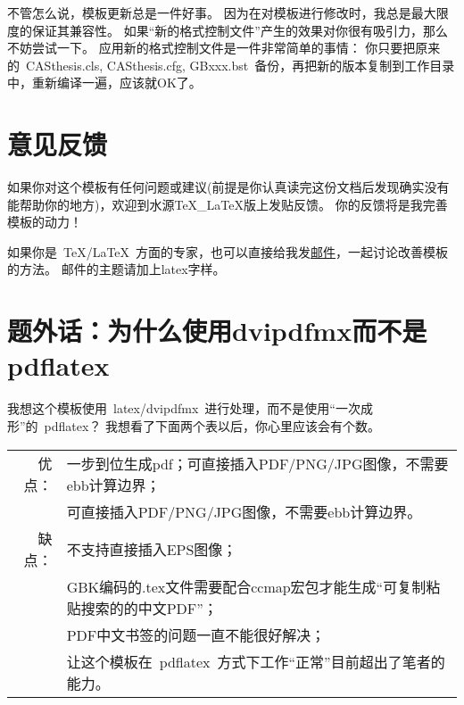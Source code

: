 不管怎么说，模板更新总是一件好事。
因为在对模板进行修改时，我总是最大限度的保证其兼容性。
如果``新的格式控制文件''产生的效果对你很有吸引力，那么不妨尝试一下。
应用新的格式控制文件是一件非常简单的事情：
你只要把原来的~CASthesis.cls, CASthesis.cfg, GBxxx.bst~备份，再把新的版本复制到工作目录中，重新编译一遍，应该就OK了。

\section{意见反馈}
\label{sec:replay}

如果你对这个模板有任何问题或建议(前提是你认真读完这份文档后发现确实没有能帮助你的地方)，欢迎到水源TeX\_LaTeX版上发贴反馈。
你的反馈将是我完善模板的动力！

如果你是~\TeX/\LaTeX~方面的专家，也可以直接给我发\href{mailto:wei.jianwen@gmail.com}{邮件}，一起讨论改善模板的方法。
邮件的主题请加上latex字样。

\section{题外话：为什么使用dvipdfmx而不是pdflatex}
\label{sec:whydvipdfm}

我想这个模板使用~latex/dvipdfmx~进行处理，而不是使用“一次成形”的~pdflatex？
我想看了下面两个表以后，你心里应该会有个数。

\begin{table}[!hbp]
  \centering
  \begin{tabular}{r|l}
    \toprule
    优点： & 一步到位生成pdf；可直接插入PDF/PNG/JPG图像，不需要ebb计算边界； \\
    &  可直接插入PDF/PNG/JPG图像，不需要ebb计算边界。\\
    \midrule
    缺点： & 不支持直接插入EPS图像；\\
    & GBK编码的.tex文件需要配合ccmap宏包才能生成“可复制粘贴搜索的的中文PDF”；\\
    & PDF中文书签的问题一直不能很好解决；\\
    & 让这个模板在~pdflatex~方式下工作“正常”目前超出了笔者的能力。\\
    \bottomrule
  \end{tabular}
\end{table}


